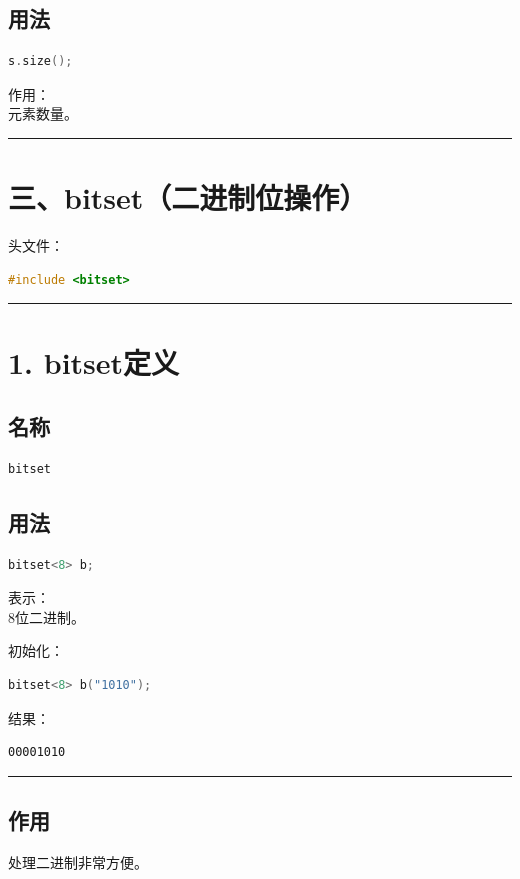 \documentclass[10pt,twocolumn]{extarticle}
\begin{document}
\subsection{用法}
\begin{lstlisting}[language=C++]
s.size();
\end{lstlisting}
作用：\\
元素数量。

\noindent\rule{\linewidth}{0.4pt}

\section{三、bitset（二进制位操作）}

头文件：
\begin{lstlisting}[language=C++]
#include <bitset>
\end{lstlisting}

\noindent\rule{\linewidth}{0.4pt}

\section{1. bitset定义}

\subsection{名称}
\begin{lstlisting}[language=C++]
bitset
\end{lstlisting}

\subsection{用法}
\begin{lstlisting}[language=C++]
bitset<8> b;
\end{lstlisting}
表示：\\
8位二进制。

初始化：
\begin{lstlisting}[language=C++]
bitset<8> b("1010");
\end{lstlisting}
结果：
\begin{lstlisting}
00001010
\end{lstlisting}

\noindent\rule{\linewidth}{0.4pt}

\subsection{作用}
处理二进制非常方便。
\end{document}
